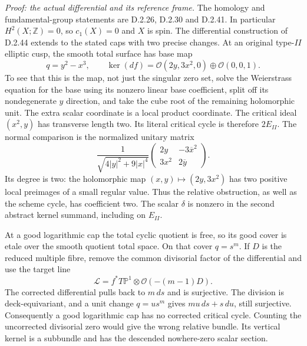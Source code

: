 \emph{Proof: the actual differential and its reference frame.}
The homology and fundamental-group statements are D.2.26,
D.2.30 and D.2.41. In particular $H^2(X;\mathbb Z)=0$, so
$c_1(X)=0$ and $X$ is spin. The differential construction of
D.2.44 extends to the stated caps with two precise changes.
At an original type-$II$ elliptic cusp, the smooth total
surface has base map
\[
 q=y^2-x^3,\qquad
 \ker(df)=\mathcal O(2y,3x^2,0)\oplus\mathcal O(0,0,1).
                                                               \tag{D45.4}
\]
To see that this is the map, not just the singular zero set,
solve the Weierstrass equation for the base using its nonzero
linear base coefficient, split off its nondegenerate $y$
direction, and take the cube root of the remaining holomorphic
unit. The extra scalar coordinate is a local product coordinate.
The critical ideal $(x^2,y)$ has transverse length two.
Its literal critical cycle is therefore $2E_{II}$.
The normal comparison is the normalized unitary matrix
\[
 \frac1{\sqrt{4|y|^2+9|x|^4}}
 \begin{pmatrix}2y&-3\overline{x}^{2}\\3x^2&2\overline y\end{pmatrix}.
                                                               \tag{D45.5}
\]
Its degree is two: the holomorphic map $(x,y)\mapsto(2y,3x^2)$
has two positive local preimages of a small regular value.
Thus the relative obstruction, as well as the scheme cycle,
has coefficient two. The scalar $\delta$ is nonzero in the
second abstract kernel summand, including on $E_{II}$.

At a good logarithmic cap the total cyclic quotient is free,
so its good cover is etale over the smooth quotient total
space. On that cover $q=s^m$. If $D$ is the reduced multiple
fibre, remove the common divisorial factor of the differential
and use the target line
\[
 \mathcal L=f^*T\mathbb P^1\otimes
                   \mathcal O(-(m-1)D).                     \tag{D45.6}
\]
The corrected differential pulls back to $m\,ds$ and is
surjective. The division is deck-equivariant, and a unit
change $q=u s^m$ gives $mu\,ds+s\,du$, still surjective.
Consequently a good logarithmic cap has no corrected critical
cycle. Counting the uncorrected divisorial zero would give
the wrong relative bundle. Its vertical kernel is a subbundle
and has the descended nowhere-zero scalar section.

